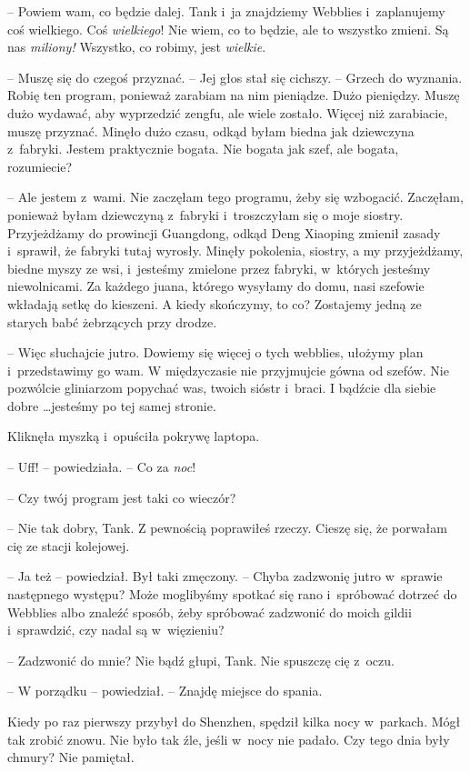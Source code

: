 \documentclass[oneside,polish,11pt,rmheadings]{mwbk}
\begin{document}
-- Powiem wam, co będzie dalej. Tank i~ja znajdziemy Webblies i~zaplanujemy coś wielkiego. Coś \textit{wielkiego}! Nie wiem, co to będzie, ale to wszystko zmieni. Są nas \textit{miliony!} Wszystko, co robimy, jest \textit{wielkie}. 

-- Muszę się do czegoś przyznać. -- Jej głos stał się cichszy. -- Grzech do wyznania. Robię ten program, ponieważ zarabiam na nim pieniądze. Dużo pieniędzy. Muszę dużo wydawać, aby wyprzedzić zengfu, ale wiele zostało. Więcej niż zarabiacie, muszę przyznać. Minęło dużo czasu, odkąd byłam biedna jak dziewczyna z~fabryki. Jestem praktycznie bogata. Nie bogata jak szef, ale bogata, rozumiecie? 

-- Ale jestem z~wami. Nie zaczęłam tego programu, żeby się wzbogacić. Zaczęłam, ponieważ byłam dziewczyną z~fabryki i~troszczyłam się o moje siostry. Przyjeżdżamy do prowincji Guangdong, odkąd Deng Xiaoping zmienił zasady i~sprawił, że fabryki tutaj wyrosły. Minęły pokolenia, siostry, a my przyjeżdżamy, biedne myszy ze wsi, i~jesteśmy zmielone przez fabryki, w~których jesteśmy niewolnicami. Za każdego juana, którego wysyłamy do domu, nasi szefowie wkładają setkę do kieszeni. A kiedy skończymy, to co? Zostajemy jedną ze starych babć żebrzących przy drodze. 

-- Więc słuchajcie jutro. Dowiemy się więcej o tych webblies, ułożymy plan i~przedstawimy go wam. W międzyczasie nie przyjmujcie gówna od szefów. Nie pozwólcie gliniarzom popychać was, twoich sióstr i~braci. I bądźcie dla siebie dobre  \ldots  jesteśmy po tej samej stronie.

Kliknęła myszką i~opuściła pokrywę laptopa.

-- Uff! -- powiedziała. -- Co za \textit{noc}! 

-- Czy twój program jest taki co wieczór? 

-- Nie tak dobry, Tank. Z pewnością poprawiłeś rzeczy. Cieszę się, że porwałam cię ze stacji kolejowej.

-- Ja też -- powiedział. Był taki zmęczony. -- Chyba zadzwonię jutro w~sprawie następnego występu? Może moglibyśmy spotkać się rano i~spróbować dotrzeć do Webblies albo znaleźć sposób, żeby spróbować zadzwonić do moich gildii i~sprawdzić, czy nadal są w~więzieniu?

-- Zadzwonić do mnie? Nie bądź głupi, Tank. Nie spuszczę cię z~oczu. 

-- W porządku -- powiedział. -- Znajdę miejsce do spania. 

 Kiedy po raz pierwszy przybył do Shenzhen, spędził kilka nocy w~parkach. Mógł tak zrobić znowu. Nie było tak źle, jeśli w~nocy nie padało. Czy tego dnia były chmury? Nie pamiętał.
\end{document}
